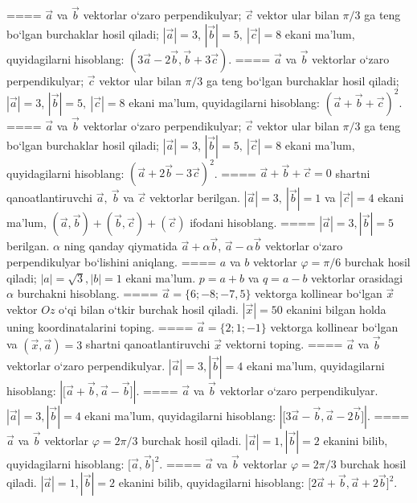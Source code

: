 ====
$\vec{a}$ va $\vec{b}$ vektorlar o‘zaro perpendikulyar; $\vec{c}$ vektor ular bilan $\pi/3$ ga teng bo‘lgan burchaklar hosil qiladi; $|\vec{a}| = 3$, $|\vec{b}| = 5,\ |\vec{c}| = 8$ ekani ma’lum, quyidagilarni hisoblang:
$\left(3\vec{a} - 2\vec{b},\vec{b} + 3\vec{c} \right) $.
====
$\vec{a}$ va $\vec{b}$ vektorlar o‘zaro perpendikulyar; $\vec{c}$ vektor ular bilan $\pi/3$ ga teng bo‘lgan burchaklar hosil qiladi; $|\vec{a}| = 3$, $|\vec{b}| = 5,\ |\vec{c}| = 8$ ekani ma’lum, quyidagilarni hisoblang:
$ (\vec{a} + \vec{b} + \vec{c}) ^{2}$.
====
$\vec{a}$ va $\vec{b}$ vektorlar o‘zaro perpendikulyar; $\vec{c}$ vektor ular bilan $\pi/3$ ga teng bo‘lgan burchaklar hosil qiladi; $|\vec{a}| = 3$, $|\vec{b}| = 5,\ |\vec{c}| = 8$ ekani ma’lum, quyidagilarni hisoblang:
$ (\vec{a} + 2\vec{b} - 3\vec{c}) ^{2}$.
====
$\vec{a} + \vec{b} + \vec{c} = 0$ shartni qanoatlantiruvchi $\vec{a},\ \vec{b}$ va $\vec{c}$ vektorlar berilgan. $|\vec{a}| = 3,\ |\vec{b}| = 1$ va $|\vec{c}| = 4$ ekani ma’lum, $\left(\vec{a},\vec{b} \right) + \left(\vec{b},\vec{c} \right) + (\vec{c}) $ ifodani hisoblang.
====
$|\vec{a}| = 3,|\vec{b}| = 5$ berilgan. $\alpha$ ning qanday qiymatida $\vec{a} + \alpha\vec{b}$, $\vec{a} - \alpha\vec{b}$ vektorlar o‘zaro perpendikulyar bo‘lishini aniqlang.
====
$a$ va $b$ vektorlar $\varphi = \pi/6$ burchak hosil qiladi; $|a| = \sqrt{3},|b| = 1$ ekani ma’lum. $p = a + b$ va $q = a - b$ vektorlar orasidagi $\alpha$ burchakni hisoblang.
====
$\vec{a} = \{ 6; - 8; - 7,5\}$ vektorga kollinear bo‘lgan $\vec{x}$ vektor $Oz$ o‘qi bilan o‘tkir burchak hosil qiladi. $|\vec{x}| = 50$ ekanini bilgan holda uning koordinatalarini toping.
====
$\vec{a} = \{ 2;1; - 1\}$ vektorga kollinear bo‘lgan va $\left(\vec{x},\vec{a} \right) = 3$ shartni qanoatlantiruvchi $\vec{x}$ vektorni toping.
====
$\vec{a}$ va $\vec{b}$ vektorlar o‘zaro perpendikulyar. $|\vec{a}| = 3,|\vec{b}| = 4$ ekani ma’lum, quyidagilarni hisoblang:
$|\lbrack\vec{a} + \vec{b},\vec{a} - \vec{b}\rbrack|$.
====
$\vec{a}$ va $\vec{b}$ vektorlar o‘zaro perpendikulyar. $|\vec{a}| = 3,|\vec{b}| = 4$ ekani ma’lum, quyidagilarni hisoblang:
$|\lbrack 3\vec{a} - \vec{b},\vec{a}-2\vec{b}\rbrack|$.
====
$\vec{a}$ va $\vec{b}$ vektorlar $\varphi = 2\pi/3$ burchak hosil qiladi. $|\vec{a}| = 1,|\vec{b}| = 2$ ekanini bilib, quyidagilarni hisoblang:
$\lbrack\vec{a},\vec{b}\rbrack^{2}$.
====
$\vec{a}$ va $\vec{b}$ vektorlar $\varphi = 2\pi/3$ burchak hosil qiladi. $|\vec{a}| = 1,|\vec{b}| = 2$ ekanini bilib, quyidagilarni hisoblang:
$\lbrack 2\overrightarrow{a} + \overrightarrow{b},\overrightarrow{a} + 2\overrightarrow{b}\rbrack^{2}$.
